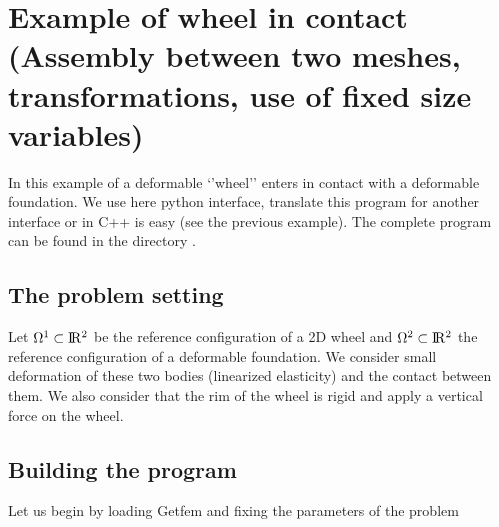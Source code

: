 \documentclass[a4paper,11pt,english]{sphinxmanual}
\begin{document}
\chapter{Example of wheel in contact (Assembly between two meshes, transformations, use of fixed size variables)}
\label{\detokenize{tutorial/wheel:example-of-wheel-in-contact-assembly-between-two-meshes-transformations-use-of-fixed-size-variables}}\label{\detokenize{tutorial/wheel:tut-wheel}}\label{\detokenize{tutorial/wheel::doc}}
\sphinxAtStartPar
In this example of a deformable ‘’wheel’’ enters in contact with a deformable foundation. We use here python interface, translate this program for another interface or in C++ is easy (see the previous example). The complete program   can be found in the directory .


\section{The problem setting}
\label{\detokenize{tutorial/wheel:the-problem-setting}}
\sphinxAtStartPar
Let \(\Omega^1 \subset \rm I\hspace{-0.15em}R^2\) be the reference configuration of a 2D wheel and \(\Omega^2 \subset \rm I\hspace{-0.15em}R^2\) the reference configuration of a deformable foundation. We consider small deformation of these two bodies (linearized elasticity) and the contact between them. We also consider that the rim of the wheel is rigid and apply a vertical force on the wheel.


\section{Building the program}
\label{\detokenize{tutorial/wheel:building-the-program}}
\sphinxAtStartPar
Let us begin by loading Getfem and fixing the parameters of the problem
\end{document}
